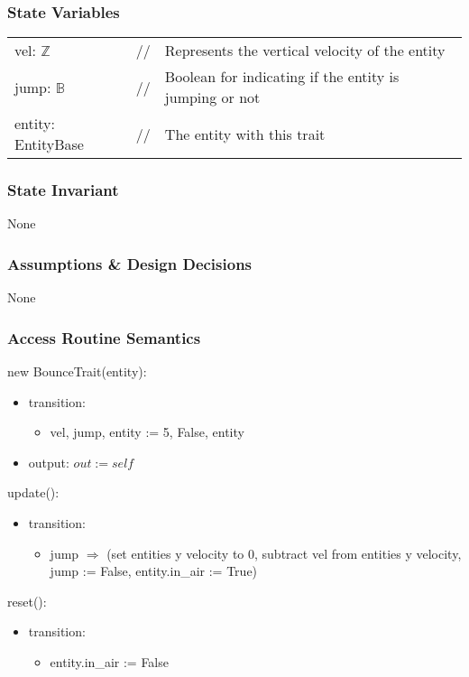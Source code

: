 \documentclass[12pt]{article}
\begin{document}
\subsubsection* {State Variables}
\begin{tabular}{lll}
    vel: $\mathbb{Z}$ & // & Represents the vertical velocity of the entity\\
    jump: $\mathbb{B}$ & // & Boolean for indicating if the entity is jumping or not\\
    entity: EntityBase & // & The entity with this trait
\end{tabular}

\subsubsection* {State Invariant}

None

\subsubsection* {Assumptions \& Design Decisions}

None

\subsubsection* {Access Routine Semantics}

new BounceTrait(entity):
\begin{itemize}
    \item transition: 
    \begin{itemize}[]
        \item vel, jump, entity := 5, False, entity
    \end{itemize}
    \item output: $out := self$
\end{itemize}

update():
\begin{itemize}
    \item transition: 
    \begin{itemize}[]
        \item jump $\Rightarrow$ (set entities y velocity to 0, subtract vel from entities y velocity, jump := False, entity.in\_air := True)
    \end{itemize}
\end{itemize}

reset():
\begin{itemize}
    \item transition: 
    \begin{itemize}[]
        \item entity.in\_air := False
    \end{itemize}
\end{itemize}
\end{document}
